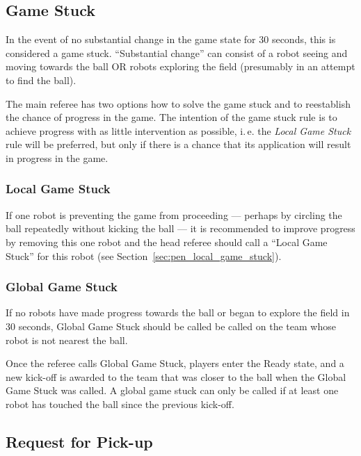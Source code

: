 \documentclass[12pt]{article}
\newcommand{\ie}{\mbox{i.\,e.}\xspace}
\begin{document}
\subsection{Game Stuck}
\label{sec:game_stuck}

In the event of no substantial change in the game state for 30 seconds, this is considered a game stuck.  ``Substantial change'' can consist of a robot seeing and moving towards the ball OR robots exploring the field (presumably in an attempt to find the ball).

The main referee has two options how to solve the game stuck and to reestablish the chance of progress in the game. The intention of the game stuck rule is to achieve progress with as little intervention as possible, \ie the \emph{Local Game Stuck} rule will be preferred, but only if there is a chance that its application will result in progress in the game.

\subsubsection{Local Game Stuck}
\label{sec:game_stuck:local}

If one robot is preventing the game from proceeding --- perhaps by circling the ball repeatedly without kicking the ball --- it is recommended to improve progress by removing this one robot and the head referee should call a ``Local Game Stuck'' for this robot (see Section~\ref{sec:pen_local_game_stuck}).

\subsubsection{Global Game Stuck}
\label{sec:game_stuck:global}

If no robots have made progress towards the ball or began to explore the field in 30 seconds, Global Game Stuck should be called be called on the team whose robot is not nearest the ball.

Once the referee calls Global Game Stuck, players enter the Ready state, and a new kick-off is awarded to the team that was closer to the ball when the Global Game Stuck was called. A global game stuck can only be called if at least one robot has touched the ball since the previous kick-off.

\subsection{Request for Pick-up}
\label{sec:request_for_pickup}
\end{document}
